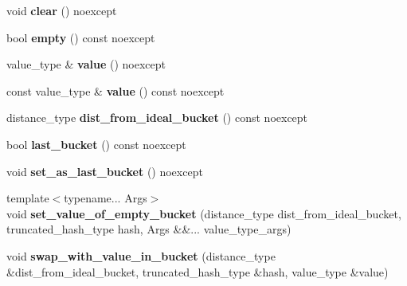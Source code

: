 \begin{DoxyCompactItemize}
void {\bfseries clear} () noexcept
\item 
\mbox{\label{classtsl_1_1detail__robin__hash_1_1bucket__entry_a340ef1dd98ee7dc8cd302f6dab921d2a}} 
bool {\bfseries empty} () const noexcept
\item 
\mbox{\label{classtsl_1_1detail__robin__hash_1_1bucket__entry_a8e20ad6cf768b8d9e5c3791e9a251a20}} 
value\+\_\+type \& {\bfseries value} () noexcept
\item 
\mbox{\label{classtsl_1_1detail__robin__hash_1_1bucket__entry_ab9f9982a0d36165c9062401800eccb0a}} 
const value\+\_\+type \& {\bfseries value} () const noexcept
\item 
\mbox{\label{classtsl_1_1detail__robin__hash_1_1bucket__entry_a9bea1736cfcae38d3e5a623e65d2ca74}} 
distance\+\_\+type {\bfseries dist\+\_\+from\+\_\+ideal\+\_\+bucket} () const noexcept
\item 
\mbox{\label{classtsl_1_1detail__robin__hash_1_1bucket__entry_a8ce2ff4b1c6c36aff7d7d535d4db738a}} 
bool {\bfseries last\+\_\+bucket} () const noexcept
\item 
\mbox{\label{classtsl_1_1detail__robin__hash_1_1bucket__entry_afb0ee5976a76914648f8238fe76a0741}} 
void {\bfseries set\+\_\+as\+\_\+last\+\_\+bucket} () noexcept
\item 
\mbox{\label{classtsl_1_1detail__robin__hash_1_1bucket__entry_ac04faad1279a09d6f335c21172798d3a}} 
{\footnotesize template$<$typename... Args$>$ }\\void {\bfseries set\+\_\+value\+\_\+of\+\_\+empty\+\_\+bucket} (distance\+\_\+type dist\+\_\+from\+\_\+ideal\+\_\+bucket, truncated\+\_\+hash\+\_\+type hash, Args \&\&... value\+\_\+type\+\_\+args)
\item 
\mbox{\label{classtsl_1_1detail__robin__hash_1_1bucket__entry_a1648ffc6d624f42fda266f2ad00c2956}} 
void {\bfseries swap\+\_\+with\+\_\+value\+\_\+in\+\_\+bucket} (distance\+\_\+type \&dist\+\_\+from\+\_\+ideal\+\_\+bucket, truncated\+\_\+hash\+\_\+type \&hash, value\+\_\+type \&value)
\end{DoxyCompactItemize}
